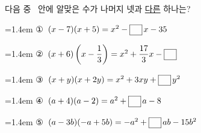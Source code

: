 다음 중 \blank\ 안에 알맞은 수가 나머지 넷과 \underline{다른} 하나는?
\par\medskip\par\noindent\hangindent=1.4em {\small ①}\ $(x-7)(x+5)=x^2-\blank\mkern3mu x-35$\par\noindent\hangindent=1.4em {\small ②}\ $(x+6)\left(x-\dfrac{1}{3}\right)=x^2+\dfrac{17}{3}x-\blank$\par\noindent\hangindent=1.4em {\small ③}\ $(x+y)(x+2y)=x^2+3xy+\blank\mkern3mu y^2$\par\noindent\hangindent=1.4em {\small ④}\ $(a+4)(a-2)=a^2+\blank\mkern3mu a-8$\par\noindent\hangindent=1.4em {\small ⑤}\ $(a-3b)(-a+5b)=-a^2+\blank\mkern3mu ab-15b^2$\par\medskip
